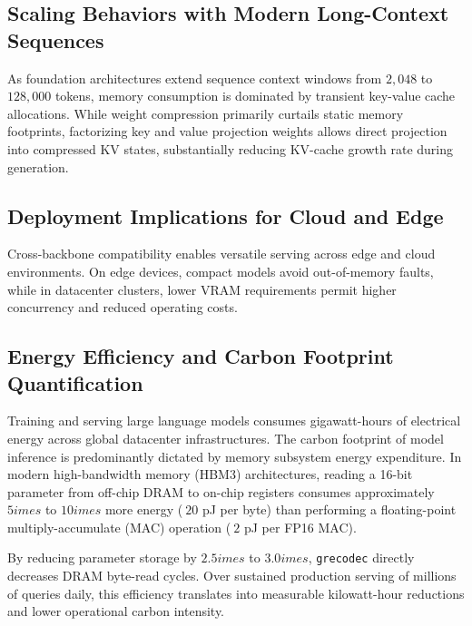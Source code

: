 \subsection{Scaling Behaviors with Modern Long-Context Sequences}
As foundation architectures extend sequence context windows from $2{,}048$ to $128{,}000$ tokens, memory consumption is dominated by transient key-value cache allocations. While weight compression primarily curtails static memory footprints, factorizing key and value projection weights allows direct projection into compressed KV states, substantially reducing KV-cache growth rate during generation.

\subsection{Deployment Implications for Cloud and Edge}
Cross-backbone compatibility enables versatile serving across edge and cloud environments. On edge devices, compact models avoid out-of-memory faults, while in datacenter clusters, lower VRAM requirements permit higher concurrency and reduced operating costs.

\subsection{Energy Efficiency and Carbon Footprint Quantification}
Training and serving large language models consumes gigawatt-hours of electrical energy across global datacenter infrastructures. The carbon footprint of model inference is predominantly dictated by memory subsystem energy expenditure. In modern high-bandwidth memory (HBM3) architectures, reading a 16-bit parameter from off-chip DRAM to on-chip registers consumes approximately $5	imes$ to $10	imes$ more energy ($~20$ pJ per byte) than performing a floating-point multiply-accumulate (MAC) operation ($~2$ pJ per FP16 MAC).

By reducing parameter storage by $2.5	imes$ to $3.0	imes$, \texttt{grecodec} directly decreases DRAM byte-read cycles. Over sustained production serving of millions of queries daily, this efficiency translates into measurable kilowatt-hour reductions and lower operational carbon intensity.
